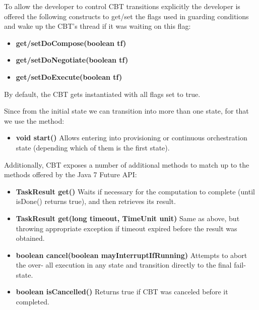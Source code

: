 To allow the developer to control CBT transitions explicitly the developer is offered the following constructs to get/set the flags used in guarding conditions and wake up the CBT’s thread if it was waiting on this flag:
\begin{itemize}
\item {\bf get/setDoCompose(boolean tf)}
\item {\bf get/setDoNegotiate(boolean tf)}
\item {\bf get/setDoExecute(boolean tf)}
\end{itemize}
By default, the CBT gets instantiated with all flags set to true. 

Since from the initial state we can transition into more than one state, for that we use
the method:
\begin{itemize}
\item {\bf void start()} Allows entering into provisioning or continuous orchestration state (depending which of them is the first state). 
\end{itemize}

Additionally, CBT exposes a number of additional methods to match up to the methods offered by the Java 7 Future API:
\begin{itemize}
\item {\bf TaskResult get()} Waits if necessary for the computation to complete (until isDone() returns true), and then retrieves its result. 
\item {\bf TaskResult get(long timeout, TimeUnit unit)} Same as above, but throwing appropriate exception if timeout expired before the result was obtained.
\item {\bf boolean cancel(boolean mayInterruptIfRunning)} Attempts to abort the over- all execution in any state and transition directly to the final fail-state. %
\item {\bf boolean isCancelled()} Returns true if CBT was canceled before it completed. %
\end{itemize}

